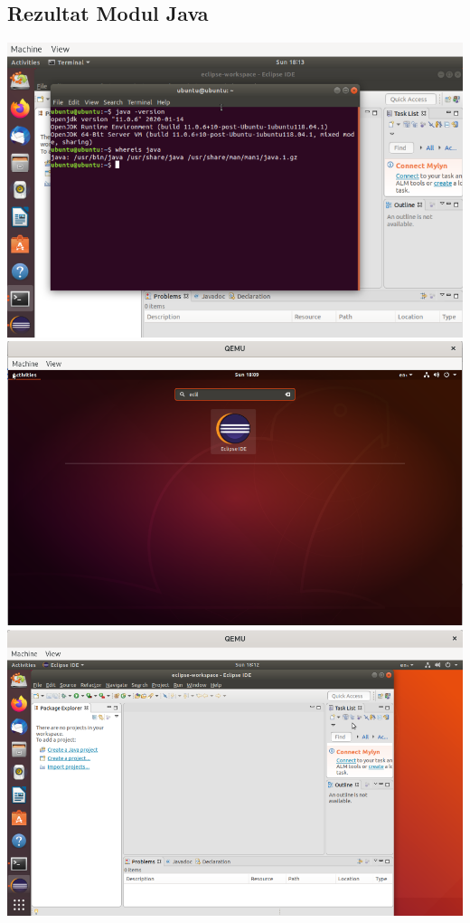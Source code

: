 \documentclass[12pt,vi]{mitthesis}
\begin{document}
\subsection*{Rezultat Modul Java}
\includegraphics[width=\linewidth]{images/javaLive.png} 
\includegraphics[width=\linewidth]{images/eclipseLive.png} 
\includegraphics[width=\linewidth]{images/eclipseLive1.png} 
\newpage
\end{document}
